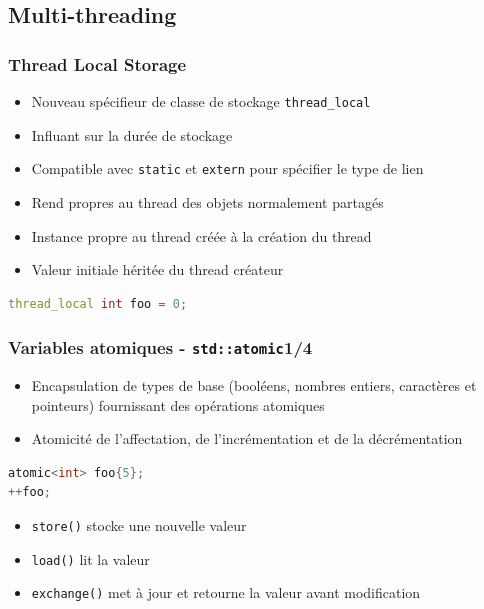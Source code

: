 \documentclass[C++.tex]{subfiles}
\begin{document}
\subsection*{Multi-threading}
\begin{frame}[fragile]
	\frametitle{Thread Local Storage}
	\begin{itemize}
		\item Nouveau \og spécifieur de classe de stockage\fg{} \lstinline|thread_local|
		\item Influant sur la durée de stockage
		\item Compatible avec \lstinline|static| et \lstinline|extern| pour spécifier le type de lien
		\item Rend propres au thread des objets normalement partagés


		\item Instance propre au thread créée à la création du thread
		\item Valeur initiale héritée du thread créateur
	\end{itemize}

	\begin{lstlisting}[language=C++]
thread_local int foo = 0;\end{lstlisting}
\end{frame}

\begin{frame}[fragile]
	\frametitle{Variables atomiques - \lstinline|std::atomic|\titlehfill{}1/4}
	\begin{itemize}
		\item Encapsulation de types de base (booléens, nombres entiers, caractères et pointeurs) fournissant des opérations atomiques
		\item Atomicité de l'affectation, de l'incrémentation et de la décrémentation
	\end{itemize}

	\begin{lstlisting}[language=C++]
atomic<int> foo{5};
++foo; \end{lstlisting}

	\begin{itemize}
		\item \lstinline|store()| stocke une nouvelle valeur
		\item \lstinline|load()| lit la valeur
		\item \lstinline|exchange()| met à jour et retourne la valeur avant modification
	\end{itemize}
\end{frame}
\end{document}
